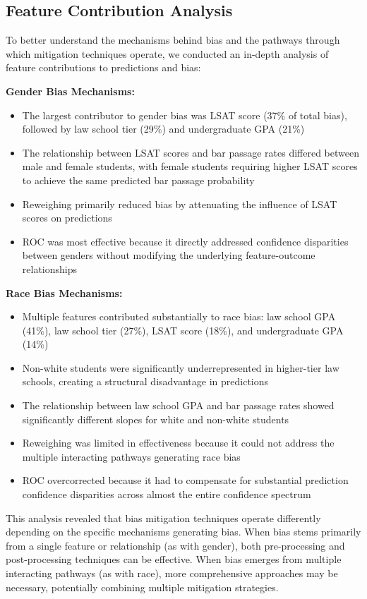 \documentclass[10pt,journal,compsoc]{IEEEtran}
\begin{document}
\subsection{Feature Contribution Analysis}
To better understand the mechanisms behind bias and the pathways through which mitigation techniques operate, we conducted an in-depth analysis of feature contributions to predictions and bias:

\textbf{Gender Bias Mechanisms:}
\begin{itemize}
\item The largest contributor to gender bias was LSAT score (37\% of total bias), followed by law school tier (29\%) and undergraduate GPA (21\%)
\item The relationship between LSAT scores and bar passage rates differed between male and female students, with female students requiring higher LSAT scores to achieve the same predicted bar passage probability
\item Reweighing primarily reduced bias by attenuating the influence of LSAT scores on predictions
\item ROC was most effective because it directly addressed confidence disparities between genders without modifying the underlying feature-outcome relationships
\end{itemize}

\textbf{Race Bias Mechanisms:}
\begin{itemize}
\item Multiple features contributed substantially to race bias: law school GPA (41\%), law school tier (27\%), LSAT score (18\%), and undergraduate GPA (14\%)
\item Non-white students were significantly underrepresented in higher-tier law schools, creating a structural disadvantage in predictions
\item The relationship between law school GPA and bar passage rates showed significantly different slopes for white and non-white students
\item Reweighing was limited in effectiveness because it could not address the multiple interacting pathways generating race bias
\item ROC overcorrected because it had to compensate for substantial prediction confidence disparities across almost the entire confidence spectrum
\end{itemize}

This analysis revealed that bias mitigation techniques operate differently depending on the specific mechanisms generating bias. When bias stems primarily from a single feature or relationship (as with gender), both pre-processing and post-processing techniques can be effective. When bias emerges from multiple interacting pathways (as with race), more comprehensive approaches may be necessary, potentially combining multiple mitigation strategies.
\end{document}
